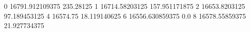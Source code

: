 0 16791.912109375 235.28125
1 16714.58203125 157.951171875
2 16653.8203125 97.189453125
4 16574.75 18.119140625
6 16556.630859375 0.0
8 16578.55859375 21.927734375
